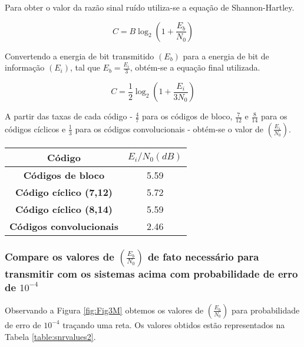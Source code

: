 Para obter o valor da razão sinal ruído utiliza-se a equação de Shannon-Hartley.

\begin{equation}
C=B\log_{2}\left(1+\frac{E_{b}}{N_{0}}\right)
\end{equation}

Convertendo a energia de bit transmitido $(E_{b})$ para a energia de bit de informação $(E_{i})$, tal que $E_{b} = \frac{E_{i}}{3}$, obtém-se a equação final utilizada.

\begin{equation}
C=\frac{1}{2}\log_{2}(1+\frac{E_{i}}{3N_{0}})
\end{equation}

A partir das taxas de cada código - $\frac{4}{7}$ para os códigos de bloco, $\frac{7}{12}$ e $\frac{8}{14}$ para os códigos cíclicos e $\frac{1}{3}$ para os códigos convolucionais - obtém-se o valor de $(\frac{E_{i}}{N_{0}})$.

\begin{table}[H]
	\centering
	\captionsetup{font=scriptsize}
	\begin{tabular}{c|c}
		\textbf{Código} & \textbf{$E_{i}/N_{0} (dB)$} \\ \hline
		\textbf{Códigos de bloco} & 5.59 \\
		\textbf{Código cíclico (7,12)} & 5.72 \\
		\textbf{Código cíclico (8,14)} & 5.59 \\
		\textbf{Códigos convolucionais} & 2.46
	\end{tabular}
\end{table}

\subsubsection{Compare os valores de $(\frac{E_{b}}{N_{0}})$ de fato necessário para transmitir com os sistemas acima com probabilidade de erro de $10^{-4}$}

Observando a Figura \ref{fig:Fig3M} obtemos os valores de $(\frac{E_{b}}{N_{0}})$ para probabilidade de erro de $10^{-4}$ traçando uma reta. Os valores obtidos estão representados na Tabela \ref{table:snrvalues2}.


